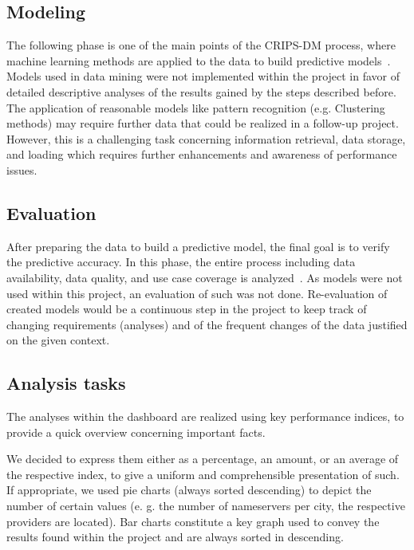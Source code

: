 \subsection{Modeling}\label{subsec:modeling}
The following phase is one of the main points of the CRIPS-DM process, where machine learning methods are applied to the data to build predictive models~\autocite[cf.][]{Semmelmann.2020}.
Models used in data mining were not implemented within the project in favor of detailed descriptive analyses of the results gained by the steps described before.
The application of reasonable models like pattern recognition (e.g. Clustering methods) may require further data that could be realized in a follow-up project.
However, this is a challenging task concerning information retrieval, data storage, and loading which requires further enhancements and awareness of performance issues.



\subsection{Evaluation}\label{subsec:evaluation}
After preparing the data to build a predictive model, the final goal is to verify the predictive accuracy.
In this phase, the entire process including data availability, data quality, and use case coverage is analyzed~\autocite[cf.][]{Semmelmann.2020}.
As models were not used within this project, an evaluation of such was not done.
Re-evaluation of created models would be a continuous step in the project to keep track of changing requirements (analyses) and of the frequent changes of the data justified on the given context.


\subsection{Analysis tasks}\label{subsec:analysistasks}
The analyses within the dashboard are realized using key performance indices, to provide a quick overview concerning important facts.

We decided to express them either as a percentage, an amount, or an average of the respective index, to give a uniform and comprehensible presentation of such.
If appropriate, we used pie charts (always sorted descending) to depict the number of certain values (e. g. the number of nameservers per city, the respective providers are located).
Bar charts constitute a key graph used to convey the results found within the project and are always sorted in descending.


